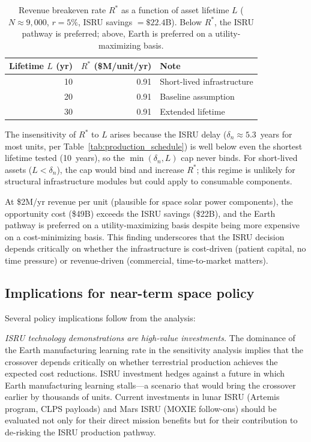 \documentclass[preprint,12pt]{elsarticle}
\begin{document}
\begin{table}[htbp]
\centering
\caption{Revenue breakeven rate $R^*$ as a function of asset lifetime $L$ ($N \approx 9{,}000$, $r = 5\%$, ISRU savings $= \$22.4$B). Below $R^*$, the ISRU pathway is preferred; above, Earth is preferred on a utility-maximizing basis.}
\label{tab:revenue_breakeven}
\small
\begin{tabular}{@{}rrl@{}}
\toprule
Lifetime $L$ (yr) & $R^*$ (\$M/unit/yr) & Note \\
\midrule
10  & 0.91 & Short-lived infrastructure \\
20  & 0.91 & Baseline assumption \\
30  & 0.91 & Extended lifetime \\
\bottomrule
\end{tabular}
\end{table}

The insensitivity of $R^*$ to $L$ arises because the ISRU delay ($\delta_n \approx 5.3$~years for most units, per Table~\ref{tab:production_schedule}) is well below even the shortest lifetime tested (10~years), so the $\min(\delta_n, L)$ cap never binds. For short-lived assets ($L < \delta_n$), the cap would bind and increase $R^*$; this regime is unlikely for structural infrastructure modules but could apply to consumable components.

At \$2M/yr revenue per unit (plausible for space solar power components), the opportunity cost (\$49B) exceeds the ISRU savings (\$22B), and the Earth pathway is preferred on a utility-maximizing basis despite being more expensive on a cost-minimizing basis. This finding underscores that the ISRU decision depends critically on whether the infrastructure is cost-driven (patient capital, no time pressure) or revenue-driven (commercial, time-to-market matters).

\subsection{Implications for near-term space policy}

Several policy implications follow from the analysis:

\emph{ISRU technology demonstrations are high-value investments.} The dominance of the Earth manufacturing learning rate in the sensitivity analysis implies that the crossover depends critically on whether terrestrial production achieves the expected cost reductions. ISRU investment hedges against a future in which Earth manufacturing learning stalls---a scenario that would bring the crossover earlier by thousands of units. Current investments in lunar ISRU (Artemis program, CLPS payloads) and Mars ISRU (MOXIE follow-ons) should be evaluated not only for their direct mission benefits but for their contribution to de-risking the ISRU production pathway.
\end{document}
